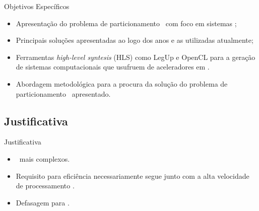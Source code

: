    
      \begin{frame}{Objetivos Específicos}
          \begin{itemize} \setlength{\itemsep}{1.8em}
            \item Apresentação do problema de particionamento \hs\ com foco em sistemas \wearables;
         
            \item Principais soluções apresentadas ao logo dos anos e as utilizadas atualmente;
         
            \item  Ferramentas \textit{high-level syntesis} (HLS) como LegUp e OpenCL para a geração de sistemas computacionais que usufruem de aceleradores em \hardware.
         
            \item Abordagem metodológica para a procura da solução do problema de particionamento \hs\ apresentado.
         \end{itemize}
      \end{frame}


   \subsection{Justificativa}
      
      \begin{frame}{Justificativa}
         \begin{itemize} \setlength{\itemsep}{1.8em}
            \item \Designs\ mais complexos.
            
            \item Requisito para eficiência necessariamente segue junto com a alta velocidade de processamento \cite{Trindade2016, Arato2005, Yan2017}.
	
	         \item Defasagem para \wearables.
	         
         \end{itemize}

      \end{frame}
